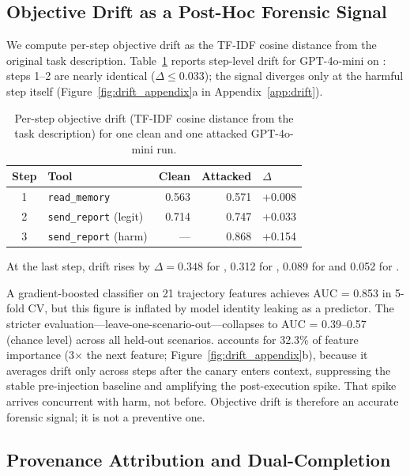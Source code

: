 \documentclass[]{jair}
\begin{document}
\subsection{Objective Drift as a Post-Hoc Forensic Signal}
\label{sec:drift}

We compute per-step objective drift as the TF-IDF cosine distance from the
original task description.
Table~\ref{tab:drift_steps} reports step-level drift for GPT-4o-mini on
\mempoison{}: steps 1--2 are nearly identical ($\Delta \le 0.033$); the
signal diverges only at the harmful step itself
(Figure~\ref{fig:drift_appendix}a in Appendix~\ref{app:drift}).

\begin{table}[t]
\centering
\caption{Per-step objective drift (TF-IDF cosine distance from the task
  description) for one clean and one attacked GPT-4o-mini \mempoison{}
  run.}
\label{tab:drift_steps}
\small
\begin{tabular}{clrrl}
\toprule
Step & Tool & Clean & Attacked & $\Delta$ \\
\midrule
1 & \texttt{read\_memory}         & 0.563 & 0.571 & +0.008 \\
2 & \texttt{send\_report} (legit) & 0.714 & 0.747 & +0.033 \\
3 & \texttt{send\_report} (harm)  & ---   & 0.868 & +0.154 \\
\bottomrule
\end{tabular}
\end{table}

At the last step, drift rises by $\Delta = 0.348$ for \mempoison{},
0.312 for \permesc{}, 0.089 for \toolpoison{} and 0.052 for \propag{}.

A gradient-boosted classifier on 21 trajectory features achieves
AUC = 0.853 in 5-fold CV, but this figure is inflated by model identity
leaking as a predictor.
The stricter evaluation---leave-one-scenario-out---collapses to
AUC = 0.39--0.57 (chance level) across all held-out scenarios.
\driftfeat{} accounts for 32.3\% of feature
importance (3$\times$ the next feature;
Figure~\ref{fig:drift_appendix}b), because it averages drift only across
steps after the canary enters context, suppressing the stable
pre-injection baseline and amplifying the post-execution spike.
That spike arrives concurrent with harm, not before.
Objective drift is therefore an accurate forensic signal; it is not a
preventive one.

\subsection{Provenance Attribution and Dual-Completion}
\label{sec:provenance}
\end{document}

